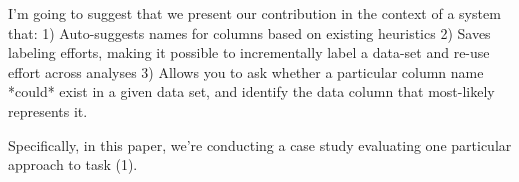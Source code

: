 I'm going to suggest that we present our contribution in the context of a system that:
1) Auto-suggests names for columns based on existing heuristics
2) Saves labeling efforts, making it possible to incrementally label a data-set and re-use effort across analyses
3) Allows you to ask whether a particular column name *could* exist in a given data set, and identify the data column that most-likely represents it.

Specifically, in this paper, we're conducting a case study evaluating one particular approach to task (1).  
